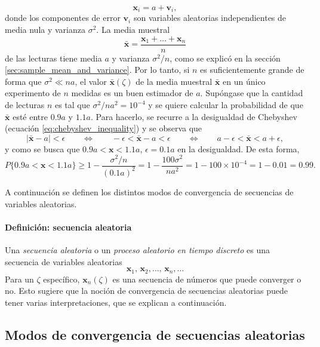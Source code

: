 \documentclass[a4paper]{report}
\newcommand{\x}{\mathbf{x}}
\begin{document}
\[
 \x_i=a+\mathbf{v}_i,
\]
donde los componentes de error \(\mathbf{v}_i\) son variables aleatorias independientes de media nula y varianza \(\sigma^2\). La media muestral
\[
 \bar{\x}=\frac{\x_1+\dots+\x_n}{n}
\]
de las lecturas tiene media \(a\) y varianza \(\sigma^2/n\), como se explicó en la sección \ref{sec:sample_mean_and_variance}. Por lo tanto, si \(n\) es suficientemente grande de forma que \(\sigma^2\ll na\), el valor \(\bar{\x}(\zeta)\) de la media muestral \(\bar{\x}\) en un único experimento de \(n\) medidas es un buen estimador de \(a\). Supóngase que la cantidad de lecturas \(n\) es tal que \(\sigma^2/na^2=10^{-4}\) y se quiere calcular la probabilidad de que \(\bar{\x}\) esté entre \(0.9a\) y \(1.1a\). Para hacerlo, se recurre a la desigualdad de Chebyshev (ecuación \ref{eq:chebyshev_inequality}) y se observa que
\[
 |\bar{\x}-a|<\epsilon\qquad\Leftrightarrow\qquad -\epsilon<\bar{\x}-a<\epsilon
 \qquad\Leftrightarrow\qquad a-\epsilon<\bar{\x}<a+\epsilon,
\]
y como se busca que \(0.9a<\mathbf{\x}<1.1a\), \(\epsilon=0.1a\) en la desigualdad. De esta forma,
\[
  P\{0.9a<\mathbf{\x}<1.1a\}\geq 1-\frac{\sigma^2/n}{(0.1a)^2}=1-\frac{100\sigma^2}{na^2}=1-100\times10^{-4}=1-0.01=0.99.
\]

A continuación se definen los distintos modos de convergencia de secuencias de variables aleatorias.

\paragraph{Definición: secuencia aleatoria} Una \emph{secuencia aleatoria} o un \emph{proceso aleatorio en tiempo discreto} es una secuencia de variables aleatorias
\[
 \x_1,\,\x_2,\dots,\,\x_n,\dots
\]
Para un \(\zeta\) específico, \(\x_n(\zeta)\) es una secuencia de números que puede converger o no. Esto sugiere que la noción de convergencia de secuencias aleatorias puede tener varias interpretaciones, que se explican a continuación.

\subsection{Modos de convergencia de secuencias aleatorias}\label{sec:convergence_modes}
\end{document}
